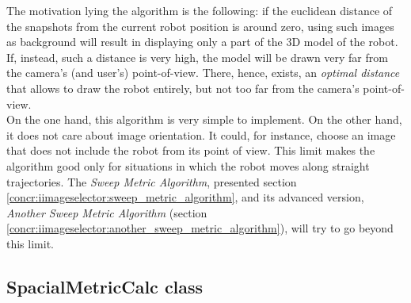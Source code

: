 The motivation lying the algorithm is the following: 
if the euclidean distance of the snapshots from the current 
robot position is around zero, using such images as background 
will result in displaying only a part of the 3D model of the robot.
If, instead, such a distance is very high, the model will be drawn 
very far from the camera's (and user's) point-of-view.
There, hence, exists, an \textit{optimal distance} that allows 
to draw the robot entirely, but not too far from the camera's 
point-of-view. 
\\
On the one hand, this algorithm is very simple to implement.
On the other hand, it does not care about image orientation. 
It could, for instance, choose an image that does not include 
the robot from its point of view. 
This limit makes the algorithm good only for situations 
in which the robot moves along straight trajectories.
The \textit{Sweep Metric Algorithm}, presented section
\ref{concr:iimageselector:sweep_metric_algorithm}, and its advanced version,
\textit{Another Sweep Metric Algorithm} (section
\ref{concr:iimageselector:another_sweep_metric_algorithm}),
will try to go beyond  this limit.


\subsection{SpacialMetricCalc class}
\label{concr:iimageselector:spacial_metric_class}

